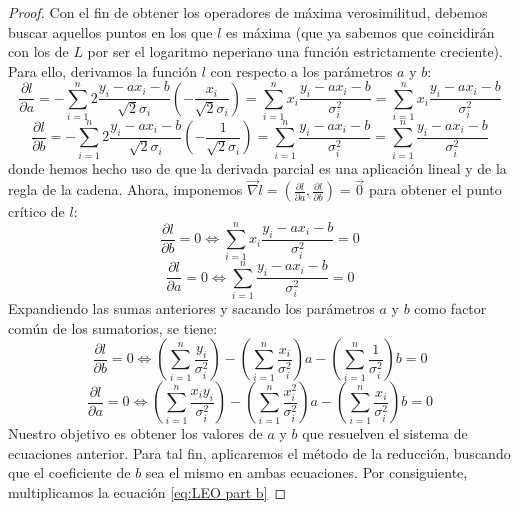 \documentclass[11pt,a4paper,spanish]{article}
\numberwithin{equation}{section}
\numberwithin{table}{section}
\numberwithin{figure}{section}
\theoremstyle{definition}
\theoremstyle{remark}
\theoremstyle{definition}
\theoremstyle{remark}
\theoremstyle{plain}
\theoremstyle{plain}
\theoremstyle{plain}
\theoremstyle{plain}
\theoremstyle{plain}
\theoremstyle{plain}
\begin{document}
\begin{proof}
		Con el fin de obtener los operadores de máxima verosimilitud, debemos
		buscar aquellos puntos en los que $l$ es máxima (que ya sabemos que
		coincidirán con los de $L$ por ser el logaritmo neperiano una función
		estrictamente creciente). Para ello, derivamos la función $l$ con
		respecto a los parámetros $a$ y $b$:
		\begin{equation}
			\frac{\partial l}{\partial a}=-\sum_{i=1}^{n}2\frac{y_{i}-ax_{i}-b}{\sqrt{2}\sigma_{i}}\left(-\frac{x_{i}}{\sqrt{2}\sigma_{i}}\right)=\sum_{i=1}^{n}x_{i}\frac{y_{i}-ax_{i}-b}{\sigma_{i}^{2}}=\sum_{i=1}^{n}x_{i}\frac{y_{i}-ax_{i}-b}{\sigma_{i}^{2}}\label{eq:LEO partial a}
		\end{equation}
		\begin{equation}
			\frac{\partial l}{\partial b}=-\sum_{i=1}^{n}2\frac{y_{i}-ax_{i}-b}{\sqrt{2}\sigma_{i}}\left(-\frac{1}{\sqrt{2}\sigma_{i}}\right)=\sum_{i=1}^{n}\frac{y_{i}-ax_{i}-b}{\sigma_{i}^{2}}=\sum_{i=1}^{n}\frac{y_{i}-ax_{i}-b}{\sigma_{i}^{2}}\label{eq:LEO partial b}
		\end{equation}
		donde hemos hecho uso de que la derivada parcial es una aplicación
		lineal y de la regla de la cadena. Ahora, imponemos $\vec{\nabla}l=\left(\frac{\partial l}{\partial a},\frac{\partial l}{\partial b}\right)=\vec{0}$
		para obtener el punto crítico de $l$:
		\[
		\frac{\partial l}{\partial b}=0\iff\sum_{i=1}^{n}x_{i}\frac{y_{i}-ax_{i}-b}{\sigma_{i}^{2}}=0
		\]
		\[
		\frac{\partial l}{\partial a}=0\iff\sum_{i=1}^{n}\frac{y_{i}-ax_{i}-b}{\sigma_{i}^{2}}=0
		\]
		Expandiendo las sumas anteriores y sacando los parámetros $a$ y $b$
		como factor común de los sumatorios, se tiene:
		\begin{equation}
			\frac{\partial l}{\partial b}=0\iff\left(\sum_{i=1}^{n}\frac{y_{i}}{\sigma_{i}^{2}}\right)-\left(\sum_{i=1}^{n}\frac{x_{i}}{\sigma_{i}^{2}}\right)a-\left(\sum_{i=1}^{n}\frac{1}{\sigma_{i}^{2}}\right)b=0\label{eq:LEO part b}
		\end{equation}
		\begin{equation}
			\frac{\partial l}{\partial a}=0\iff\left(\sum_{i=1}^{n}\frac{x_{i}y_{i}}{\sigma_{i}^{2}}\right)-\left(\sum_{i=1}^{n}\frac{x_{i}^{2}}{\sigma_{i}^{2}}\right)a-\left(\sum_{i=1}^{n}\frac{x_{i}}{\sigma_{i}^{2}}\right)b=0\label{eq:LEO part a}
		\end{equation}
		Nuestro objetivo es obtener los valores de $a$ y $b$ que resuelven
		el sistema de ecuaciones anterior. Para tal fin, aplicaremos el método
		de la reducción, buscando que el coeficiente de $b$ sea el mismo
		en ambas ecuaciones. Por consiguiente, multiplicamos la ecuación \vref{eq:LEO part b}

\end{proof}
\end{document}
